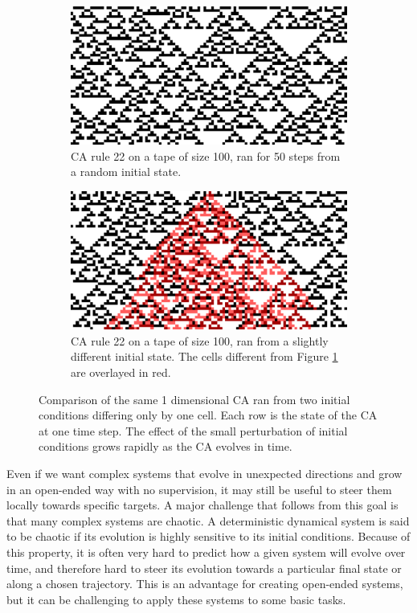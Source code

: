 \begin{figure}[htbp]
  \centering
  \begin{subfigure}[t]{.47\linewidth}
    \centering
    \includegraphics[width=.93\linewidth]{figures/ca_comp_a}
    \caption{\ac{CA} rule 22 on a tape of size 100, ran for 50 steps from a
      random initial state.}
    \label{fig:ca_comp_a}
  \end{subfigure}
  \hspace{10pt}
  \begin{subfigure}[t]{.47\linewidth}
    \centering
    \includegraphics[width=.93\linewidth]{figures/ca_comp_b}
    \caption{\ac{CA} rule 22 on a tape of size 100, ran from a slightly
      different initial state. The cells different from Figure \ref{fig:ca_comp_a} are
      overlayed in red.}
    \label{fig:ca_comp_b}
  \end{subfigure}

  \caption{Comparison of the same 1 dimensional \ac{CA} ran from two initial conditions
    differing only by one cell. Each row is the state of the \ac{CA} at one time
    step. The effect of the small perturbation of initial conditions grows
    rapidly as the \ac{CA} evolves in time.}
  \label{fig:ca_comp}
\end{figure}


Even if we want complex systems that evolve in unexpected directions and grow in
an open-ended way with no supervision, it may still be useful to steer them
locally towards specific targets. A major challenge that follows from this goal
is that many complex systems are chaotic. A deterministic dynamical system is
said to be chaotic if its evolution is highly sensitive to its initial
conditions. Because of this property, it is often very hard to predict how a
given system will evolve over time, and therefore hard to steer its evolution
towards a particular final state or along a chosen trajectory. This is an
advantage for creating open-ended systems, but it can be challenging to apply
these systems to some basic tasks.

